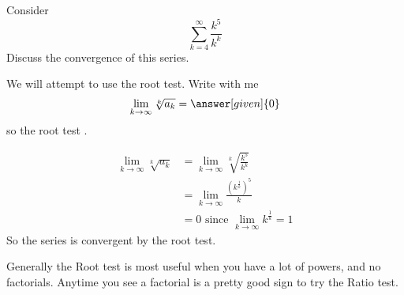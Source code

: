 \documentclass{ximera}
\begin{document}
\begin{example}
  Consider 
  \[
  \sum_{k=4}^\infty \frac{k^5}{k^k}
  \]
  Discuss the convergence of this series.
  \begin{explanation}
    We will attempt to use the root test. Write with me
    \[
    \lim_{k \to \infty} \sqrt[k]{a_k} = \answer[given]{0}	
    \]
    so the root test
	  .		
	  \begin{hint}
	    \begin{align*}
	      \lim_{k \to \infty} \sqrt[k]{a_k} &= \lim_{k \to \infty} \sqrt[k]{\frac{k^5}{k^k}}\\
	      &=\lim_{k \to \infty} \frac{(k^{\frac{1}{k}})^5}{k}\\
	      &=0 \textrm{ since $\lim_{k \to \infty} k^\frac{1}{k} = 1$}
	    \end{align*}
	    So the series is convergent by the root test.
	  \end{hint}
  \end{explanation}
\end{example}
  
  Generally the Root test is most useful when you have a lot of powers, and no factorials.  Anytime you see a factorial is a pretty good sign to try the Ratio test.
\end{document}
